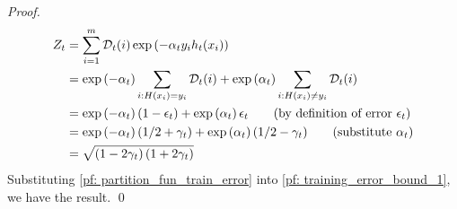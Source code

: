 \documentclass[11pt]{article}
\begin{document}
\begin{itemize}
\begin{proof}
\begin{align}
Z_t &= \sum_{i=1}^{m}{\mathcal D}_t(i)\exp\left(-\alpha_t y_i h_t(x_i)\right) \nonumber\\
&= \exp\left(-\alpha_t\right)\sum_{i: H(x_i) = y_i}{\mathcal D}_t(i)  + \exp\left(\alpha_t\right)\sum_{i: H(x_i) \neq y_i}{\mathcal D}_t(i)  \nonumber\\
&= \exp\left(-\alpha_t\right)(1 - \epsilon_t) + \exp\left(\alpha_t\right)\epsilon_t \qquad (\text{by definition of error }\epsilon_t)  \nonumber\\
&= \exp\left(-\alpha_t\right)(1/2 + \gamma_t) + \exp\left(\alpha_t\right)(1/2 - \gamma_t) \qquad (\text{substitute }\alpha_t) \nonumber\\
&=\sqrt{\left(1 - 2\gamma_t\right)\left(1 +2 \gamma_t\right)} \label{pf: partition_fun_train_error}
\end{align} Substituting \eqref{pf: partition_fun_train_error} into \eqref{pf: training_error_bound_1}, we have the result. \qed
\end{proof}

\end{itemize}
\end{document}
